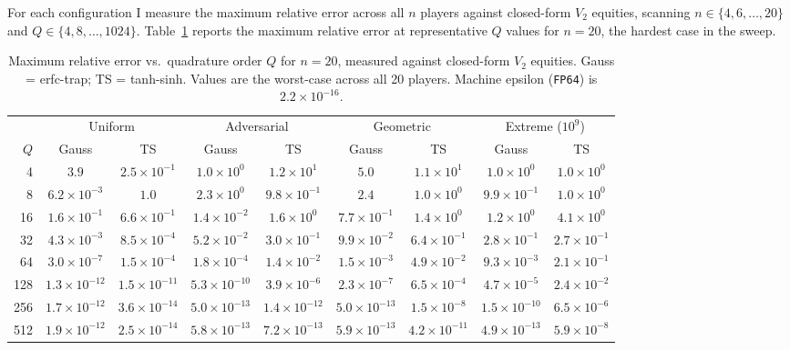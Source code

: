 \documentclass[11pt]{article}
\begin{document}
For each configuration I measure the maximum relative error across all $n$
players against closed-form $V_2$ equities, scanning
$n \in \{4, 6, \ldots, 20\}$ and $Q \in \{4, 8, \ldots, 1024\}$.
Table~\ref{tab:accuracy} reports the maximum relative error at representative
$Q$ values for $n = 20$, the hardest case in the sweep.

\begin{table}[t]
\centering
\caption{Maximum relative error vs.\ quadrature order $Q$ for $n = 20$,
  measured against closed-form $V_2$ equities. Gauss = erfc-trap;
  TS = tanh-sinh. Values are the worst-case across all 20 players.
  Machine epsilon (\texttt{FP64}) is $2.2 \times 10^{-16}$.}
\label{tab:accuracy}
\begin{tabular}{@{}r c c c c c c c c@{}}
\toprule
& \multicolumn{2}{c}{Uniform} & \multicolumn{2}{c}{Adversarial}
  & \multicolumn{2}{c}{Geometric} & \multicolumn{2}{c}{Extreme ($10^9$)}\\
\cmidrule(lr){2-3} \cmidrule(lr){4-5} \cmidrule(lr){6-7} \cmidrule(lr){8-9}
$Q$ & Gauss & TS & Gauss & TS & Gauss & TS & Gauss & TS \\
\midrule
4    & $3.9$                & $2.5 \times 10^{-1}$  & $1.0 \times 10^{0}$ & $1.2 \times 10^{1}$ & $5.0$                & $1.1 \times 10^{1}$ & $1.0 \times 10^{0}$ & $1.0 \times 10^{0}$ \\
8    & $6.2 \times 10^{-3}$ & $1.0$                 & $2.3 \times 10^{0}$ & $9.8 \times 10^{-1}$ & $2.4$                & $1.0 \times 10^{0}$ & $9.9 \times 10^{-1}$ & $1.0 \times 10^{0}$ \\
16   & $1.6 \times 10^{-1}$ & $6.6 \times 10^{-1}$  & $1.4 \times 10^{-2}$ & $1.6 \times 10^{0}$ & $7.7 \times 10^{-1}$ & $1.4 \times 10^{0}$ & $1.2 \times 10^{0}$ & $4.1 \times 10^{0}$ \\
32   & $4.3 \times 10^{-3}$ & $8.5 \times 10^{-4}$  & $5.2 \times 10^{-2}$ & $3.0 \times 10^{-1}$ & $9.9 \times 10^{-2}$ & $6.4 \times 10^{-1}$ & $2.8 \times 10^{-1}$ & $2.7 \times 10^{-1}$ \\
64   & $3.0 \times 10^{-7}$ & $1.5 \times 10^{-4}$  & $1.8 \times 10^{-4}$ & $1.4 \times 10^{-2}$ & $1.5 \times 10^{-3}$ & $4.9 \times 10^{-2}$ & $9.3 \times 10^{-3}$ & $2.1 \times 10^{-1}$ \\
128  & $1.3 \times 10^{-12}$& $1.5 \times 10^{-11}$ & $5.3 \times 10^{-10}$& $3.9 \times 10^{-6}$ & $2.3 \times 10^{-7}$ & $6.5 \times 10^{-4}$ & $4.7 \times 10^{-5}$ & $2.4 \times 10^{-2}$ \\
256  & $1.7 \times 10^{-12}$& $3.6 \times 10^{-14}$ & $5.0 \times 10^{-13}$& $1.4 \times 10^{-12}$& $5.0 \times 10^{-13}$& $1.5 \times 10^{-8}$ & $1.5 \times 10^{-10}$& $6.5 \times 10^{-6}$ \\
512  & $1.9 \times 10^{-12}$& $2.5 \times 10^{-14}$ & $5.8 \times 10^{-13}$& $7.2 \times 10^{-13}$& $5.9 \times 10^{-13}$& $4.2 \times 10^{-11}$ & $4.9 \times 10^{-13}$& $5.9 \times 10^{-8}$ \\
\bottomrule
\end{tabular}
\end{table}
\end{document}
